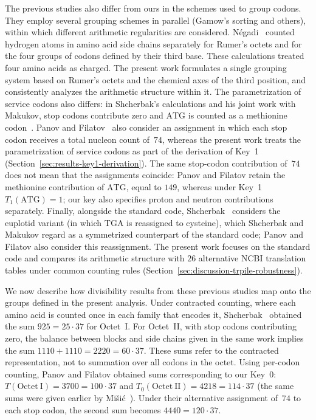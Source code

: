 \documentclass[11pt,a4paper]{article}
\renewcommand{\_}{\origunderscore\allowbreak}
\begin{document}
The previous studies also differ from ours in the schemes
used to group codons. They employ several grouping schemes
in parallel (Gamow's sorting and others), within which
different arithmetic regularities are considered. N\'egadi~\cite{negadi2024} counted hydrogen atoms in amino acid side chains
separately for Rumer's octets and for the four groups of codons defined by their third base.
These calculations treated four amino acids as charged.
The present work formulates a single grouping system based
on Rumer's octets and the chemical axes of the third position,
and consistently analyzes the arithmetic structure within it.
The parametrization of service codons also differs:
in Shcherbak's calculations and his joint work with Makukov,
stop codons contribute zero and $\mathrm{ATG}$ is counted as a methionine codon~\cite{shcherbak1993,shcherbak2003,makukov2013}.
Panov and Filatov~\cite{panov2024} also consider an assignment in which each stop codon
receives a total nucleon count of~$74$, whereas the present
work treats the parametrization of service codons as part
of the derivation of Key~1
(Section~\ref{sec:results-key1-derivation}).
The same stop-codon contribution of~$74$ does not mean
that the assignments coincide: Panov and Filatov retain
the methionine contribution of $\mathrm{ATG}$,
equal to $149$, whereas under Key~1
$T_{1}(\mathrm{ATG})=1$; our key also specifies
proton and neutron contributions separately.
Finally, alongside the standard code, Shcherbak~\cite{shcherbak2003}
considers the euplotid variant (in which $\mathrm{TGA}$
is reassigned to cysteine), which Shcherbak and Makukov regard as a symmetrized counterpart
of the standard code; Panov and Filatov also consider this
reassignment. The present work focuses on the standard code
and compares its arithmetic structure with
$26$ alternative NCBI translation tables under common
counting rules
(Section~\ref{sec:discussion-trpile-robustness}).

We now describe how divisibility results from these previous
studies map onto the groups defined in the present analysis.
Under contracted counting, where each amino acid is counted
once in each family that encodes it, Shcherbak~\cite{shcherbak1993}
obtained the sum $925 = 25 \cdot 37$ for Octet~I.
For Octet~II, with stop codons contributing zero,
the balance between blocks and side chains given in the same work implies
the sum $1110+1110=2220=60\cdot37$.
These sums refer to the contracted representation,
not to summation over all codons in the octet.
Using per-codon counting, Panov and Filatov obtained
sums corresponding to our Key~0:
$T(\mathrm{Octet~I}) = 3700 = 100 \cdot 37$
and $T_{0}(\mathrm{Octet~II}) = 4218 = 114 \cdot
37$ (the same sums were given earlier by Mi\v{s}i\'c~\cite[Table~3]{misic2016}). Under their alternative assignment of~$74$
to each stop codon, the second sum becomes
$4440 = 120 \cdot 37$.
\end{document}
